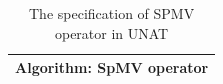 \documentclass[conference]{IEEEtran}
\begin{document}
\begin{table}[]
\caption{The specification of SPMV operator in UNAT}
\begin{tabular}{l}
\hline Algorithm: SpMV operator                                                                                                                                                                                                                                                                                                                                                                                                                                                                                                                                                                                                                                                                                                                                                                                                                                                                                                                                                                                                                                                                                                                                                                                                                                                                                                                                                                                          \\ \hline

\end{tabular}
\end{table}
\end{document}
